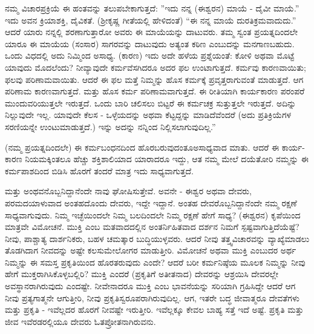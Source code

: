 ನಮ್ಮ ವಿಚಾರಪ್ರಕ್ರಿಯೆ ಈ ಹಂತವನ್ನು ತಲುಪಬೇಕಾಗುತ್ತದೆ: ''ಇದು ನನ್ನ (ಈಶ್ವರನ) ಮಾಯೆ - ದೈವೀ ಮಾಯೆ.'' ಇದು ಅವನ ಕ್ರಿಯಾಶಕ್ತಿ, ದೈವಿಕತೆ. (ಶ‍್ರೀಕೃಷ್ಣ ಗೀತೆಯಲ್ಲಿ ಹೇಳಿದಂತೆ) “ಈ ನನ್ನ ಮಾಯೆ ದುರತಿಕ್ರಮವಾದುದು.” ಆದರೆ ಯಾರು ನನ್ನಲ್ಲಿ ಶರಣಾಗುತ್ತಾರೋ ಅವರು ಈ ಮಾಯೆಯನ್ನು ದಾಟುವರು. ತಮ್ಮ ಸ್ವಂತ ಪ್ರಯತ್ನದಿಂದಲೇ ಯಾರೂ ಈ ಮಾಯೆಯ (ಸಂಸಾರ) ಸಾಗರವನ್ನು ದಾಟುವುದು ಅತ್ಯಂತ ಕಠಿಣ ಎಂಬುದನ್ನು ಮನಗಾಣಬಹುದು. ಒಂದು ವಿಧದಲ್ಲಿ ಅದು ನಿಮ್ಮಿಂದ ಅಸಾಧ್ಯ. (ಕಾರಣ) ಇದು ಅದೇ ಹಳೆಯ ಪ್ರಶ್ನೆಯಂತೆ: ಕೋಳಿ ಅಥವಾ ಮೊಟ್ಟೆ ಯಾವುದು ಮೊದಲೆಂದು? ನೀವ್ಯಾವುದೇ ಕರ್ಮವೆಸಗಿದರೂ ಅದರ ಫಲ ಉಂಟಾಗುತ್ತದೆ. ಕರ್ಮವು ಕಾರಣವಾಯಿತು; ಫಲವು ಪರಿಣಾಮವಾಯಿತು. ಆದರೆ ಈ ಫಲ ಮತ್ತೆ ನಿಮ್ಮನ್ನು ಹೊಸ ಕರ್ಮಕ್ಕೆ ಪ್ರವೃತ್ತರಾಗುವಂತೆ ಮಾಡುತ್ತದೆ. ಆಗ ಪರಿಣಾಮ ಕಾರಣವಾಗುತ್ತದೆ. ಮತ್ತು ಹೊಸ ಕರ್ಮ ಪರಿಣಾಮವಾಗುತ್ತದೆ. ಈ ರೀತಿಯಾಗಿ ಕಾರ್ಯಕಾರಣ ಪರಂಪರೆ ಮುಂದುವರಿಯುತ್ತಲೇ ಇರುತ್ತದೆ. ಒಂದು ಬಾರಿ ಚಲಿಸಲು ಬಿಟ್ಟರೆ ಈ ಕರ್ಮಚಕ್ರ ಸುತ್ತುತ್ತಲೇ ಇರುತ್ತದೆ. ಅದಿನ್ನು ನಿಲ್ಲುವುದೇ ಇಲ್ಲ. ಯಾವುದೇ ಕೆಲಸ - ಒಳ್ಳೆಯದನ್ನು ಅಥವಾ ಕೆಟ್ಟದ್ದನ್ನು ಮಾಡಿದೆವೆಂದರೆ (ಅದು ಪ್ರತಿಕ್ರಿಯೆಗಳ ಸರಣಿಯನ್ನೇ ಉಂಟುಮಾಡುತ್ತದೆ.) ಇನ್ನು ಅದನ್ನು ನನ್ನಿಂದ ನಿಲ್ಲಿಸಲಾಗುವುದಿಲ್ಲ.”

(ನಮ್ಮ ಪ್ರಯತ್ನದಿಂದಲೇ) ಈ ಕರ್ಮಬಂಧನದಿಂದ ಹೊರಬರುವುದಂತೂ\break ಅಸಾಧ್ಯವಾದ ಮಾತು. ಆದರೆ ಈ ಕಾರ್ಯ-ಕಾರಣ ನಿಯಮಕ್ಕಿಂತಲೂ ಹೆಚ್ಚು ಶಕ್ತಿಶಾಲಿಯಾದ ಯಾರಾದರೂ ಇದ್ದು, ಆತ ನಮ್ಮ ಮೇಲೆ ದಯೆತೋರಿ ನಮ್ಮನ್ನು ಈ ಕರ್ಮಪಾಶದಿಂದ ಬಿಡಿಸಿ ಹೊರಗೆ ತಂದರೆ ಮಾತ್ರ ಇದು ಸಾಧ್ಯವಾಗುತ್ತದೆ.

ಮತ್ತು ಅಂಥವನೊಬ್ಬನಿದ್ದಾನೆಂದೇ ನಾವು ಘೋಷಿಸುತ್ತೇವೆ. ಅವನೇ - ಈಶ್ವರ ಅಥವಾ ದೇವರು, ಪರಮದಯಾಳುವಾದ ಅಂತಹದೊಂದು ದೇವರು, ಇದ್ದೇ ಇದ್ದಾನೆ. ಅಂತಹ ದೇವರೊಬ್ಬನಿದ್ದಾನೆಂದೇ ನಮ್ಮ ರಕ್ಷಣೆ ಸಾಧ್ಯವಾಗುವುದು. ನಿಮ್ಮ ಇಚ್ಛೆಯಿಂದಲೇ ನಿಮ್ಮ ಬಲದಿಂದಲೇ ನಿಮ್ಮ ರಕ್ಷಣೆ ಹೇಗೆ ಸಾಧ್ಯ? (ಈಶ್ವರನ) ಕೃಪೆಯಿಂದ ಮಾತ್ರವೇ ವಿಮೋಚನೆ. ಮುಕ್ತಿ ಎಂಬ ಮತವಾದದಲ್ಲಿನ ಅಂತರ್ನಿಹಿತವಾದ ದರ್ಶನ ನಿಮಗೆ ಸ್ಪಷ್ಟವಾಗುತ್ತಿದೆಯೆಷ್ಟೆ? ನೀವು, ಪಾಶ್ಚಾತ್ಯ ದಾರ್ಶನಿಕರು, ಬಹಳ ಚಮತ್ಕಾರ ಬುದ್ಧಿಯುಳ್ಳವರು. ಆದರೆ ನೀವು ತತ್ತ್ವವಿಚಾರವನ್ನು ವ್ಯಾಖ್ಯೆಮಾಡಲು ತೊಡಗಿದಾಗ ನೀವದನ್ನು ಅಷ್ಟೇ ಕಲಸುಮೇಲೋಗರ ಮಾಡುತ್ತೀರಿ. ವಿಮೋಚನೆ ಅಥವಾ ಮುಕ್ತಿ ಎಂಬುದರ ಅರ್ಥ ನಿಮ್ಮನ್ನು ಈ ಸಮಸ್ತ ಪ್ರಕೃತಿಯಿಂದ ಹೊರತರುವುದು ಎಂದೇ? ಆದರೆ ಬರೀ ಕರ್ಮನಿಷ್ಠೆಯ ಮೂಲಕ ನಿಮ್ಮನ್ನು ನೀವು ಹೇಗೆ ಮುಕ್ತರಾಗಿಸಿಕೊಳ್ಳಬಲ್ಲಿರಿ? ಮುಕ್ತಿ ಎಂದರೆ (ಪ್ರಕೃತಿಗೆ ಅತೀತನಾದ) ದೇವರನ್ನು ಆಶ್ರಯಿಸಿ ದೇವರಲ್ಲೇ ಅವಸ್ಥಾನರಾಗಿರುವುದು ಎಂದಷ್ಟೇ. ನೀವೇನಾದರೂ ಮುಕ್ತಿ ಎಂಬ ಭಾವನೆಯನ್ನು ಸರಿಯಾಗಿ ಗ್ರಹಿಸಿದ್ದೇ ಆದರೆ ಆಗ ನೀವು ಪ್ರತ್ಯಗಾತ್ಮನೇ ಆಗುತ್ತೀರಿ, ನೀವು ಪ್ರಕೃತಿಸ್ವರೂಪರಾಗಿರುವುದಿಲ್ಲ. ಆಗ, ಇತರೇ ಬದ್ಧ ಜೀವಾತ್ಮರೂ ದೇವತೆಗಳು ಮತ್ತು ಪ್ರಕೃತಿ - ಇವೆಲ್ಲದರ ಹೊರಗೆ ನೀವಷ್ಟೇ ಇರುತ್ತೀರಿ. ಇವೆಲ್ಲಕ್ಕೂ ಕೇವಲ ಬಾಹ್ಯ ಸತ್ತೆ ಇದೆ ಅಷ್ಟೆ. ಪ್ರಕೃತಿ ಮತ್ತು ಜೀವ ಇವೆರಡರಲ್ಲಿಯೂ ದೇವರು ಓತಪ್ರೋತನಾಗಿರುವನು.

